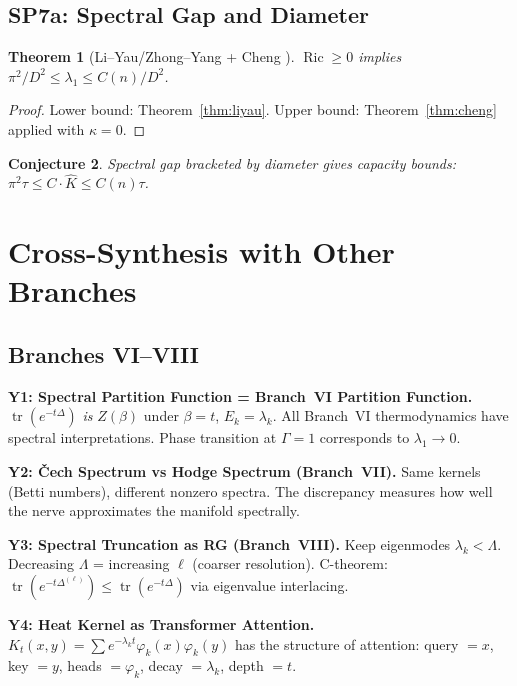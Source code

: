 \documentclass[11pt]{article}
\newtheorem{theorem}{Theorem}[section]
\newtheorem{conjecture}[theorem]{Conjecture}
\theoremstyle{definition}
\theoremstyle{remark}
\newcommand{\Ric}{\operatorname{Ric}}
\begin{document}
\subsection{SP7a: Spectral Gap and Diameter}

\begin{theorem}[Li--Yau/Zhong--Yang + Cheng {\cite{LiYau, Cheng}}]\label{thm:gapdiameter}
$\Ric \ge 0$ implies $\pi^2/D^2 \le \lambda_1 \le C(n)/D^2$.
\end{theorem}

\begin{proof}
Lower bound: Theorem~\ref{thm:liyau}. Upper bound: Theorem~\ref{thm:cheng} applied with $\kappa = 0$.
\end{proof}

\begin{conjecture}\label{conj:gapdiameter}
Spectral gap bracketed by diameter gives capacity bounds: $\pi^2\tau \le C \cdot \hat{K} \le C(n)\tau$.
\end{conjecture}


\section{Cross-Synthesis with Other Branches}
\label{sec:cross}

\subsection{Branches VI--VIII}

\textbf{Y1: Spectral Partition Function = Branch~VI Partition Function.}
$\operatorname{tr}(e^{-t\Delta})$ \emph{is} $Z(\beta)$ under $\beta = t$, $E_k = \lambda_k$. All Branch~VI thermodynamics have spectral interpretations. Phase transition at $\Gamma = 1$ corresponds to $\lambda_1 \to 0$.

\textbf{Y2: \v{C}ech Spectrum vs Hodge Spectrum (Branch~VII).}
Same kernels (Betti numbers), different nonzero spectra. The discrepancy measures how well the nerve approximates the manifold spectrally.

\textbf{Y3: Spectral Truncation as RG (Branch~VIII).}
Keep eigenmodes $\lambda_k < \Lambda$. Decreasing $\Lambda$ = increasing $\ell$ (coarser resolution). C-theorem: $\operatorname{tr}(e^{-t\Delta^{(\ell)}}) \le \operatorname{tr}(e^{-t\Delta})$ via eigenvalue interlacing.

\textbf{Y4: Heat Kernel as Transformer Attention.}
$K_t(x,y) = \sum e^{-\lambda_k t}\varphi_k(x)\varphi_k(y)$ has the structure of attention: query $= x$, key $= y$, heads $= \varphi_k$, decay $= \lambda_k$, depth $= t$.
\end{document}
